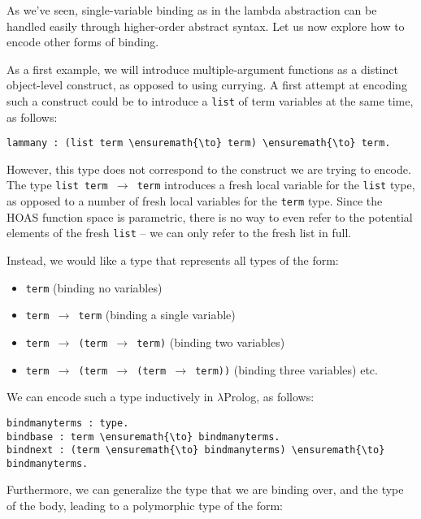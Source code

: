 As we've seen, single-variable binding as in the lambda abstraction can
be handled easily through higher-order abstract syntax. Let us now
explore how to encode other forms of binding.

As a first example, we will introduce multiple-argument functions as a
distinct object-level construct, as opposed to using currying. A first
attempt at encoding such a construct could be to introduce a
\texttt{list} of term variables at the same time, as follows:

\begin{verbatim}
lammany : (list term \ensuremath{\to} term) \ensuremath{\to} term.
\end{verbatim}

However, this type does not correspond to the construct we are trying to
encode. The type \texttt{list\ term\ \ensuremath{\to}\ term} introduces a
fresh local variable for the \texttt{list} type, as opposed to a number
of fresh local variables for the \texttt{term} type. Since the HOAS
function space is parametric, there is no way to even refer to the
potential elements of the fresh \texttt{list} -- we can only refer to
the fresh list in full.

Instead, we would like a type that represents all types of the form:

\begin{itemize}
\tightlist
\item
  \texttt{term} (binding no variables)
\item
  \texttt{term\ \ensuremath{\to}\ term} (binding a single variable)
\item
  \texttt{term\ \ensuremath{\to}\ (term\ \ensuremath{\to}\ term)} (binding
  two variables)
\item
  \texttt{term\ \ensuremath{\to}\ (term\ \ensuremath{\to}\ (term\ \ensuremath{\to}\ term))}
  (binding three variables) etc.
\end{itemize}

We can encode such a type inductively in \ensuremath{\lambda}Prolog, as follows:

\begin{verbatim}
bindmanyterms : type.
bindbase : term \ensuremath{\to} bindmanyterms.
bindnext : (term \ensuremath{\to} bindmanyterms) \ensuremath{\to} bindmanyterms.
\end{verbatim}

Furthermore, we can generalize the type that we are binding over, and
the type of the body, leading to a polymorphic type of the form:

